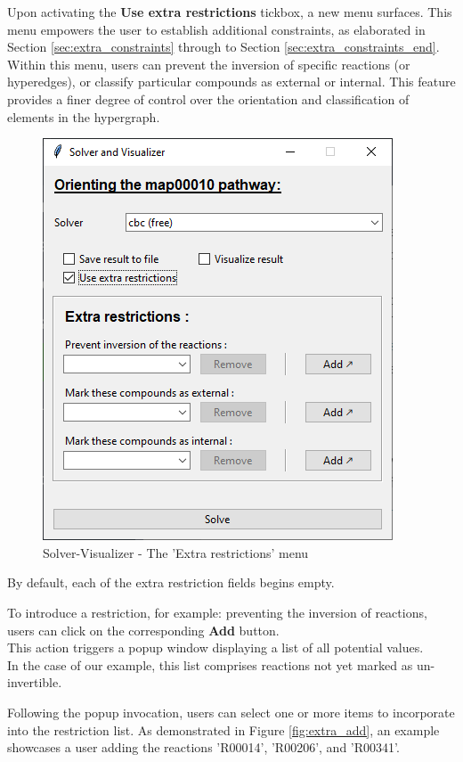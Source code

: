 Upon activating the \textbf{Use extra restrictions} tickbox, a new menu surfaces. This menu empowers the user to establish additional constraints, as elaborated in Section \ref{sec:extra_constraints} through to Section \ref{sec:extra_constraints_end}. Within this menu, users can prevent the inversion of specific reactions (or hyperedges), or classify particular compounds as external or internal. This feature provides a finer degree of control over the orientation and classification of elements in the hypergraph.

\begin{figure}[H]
    \centering
    \includegraphics[width=0.6\linewidth]{Design of the User Interface/extra_constraints.png}
    \caption{Solver-Visualizer - The 'Extra restrictions' menu}
    \label{fig:enter-label}
\end{figure}

By default, each of the extra restriction fields begins empty.

To introduce a restriction, for example: preventing the inversion of reactions, users can click on the corresponding \textbf{Add} button. \\
This action triggers a popup window displaying a list of all potential values.\\In the case of our example, this list comprises reactions not yet marked as un-invertible. 

Following the popup invocation, users can select one or more items to incorporate into the restriction list. As demonstrated in Figure \ref{fig:extra_add}, an example showcases a user adding the reactions 'R00014', 'R00206', and 'R00341'.

